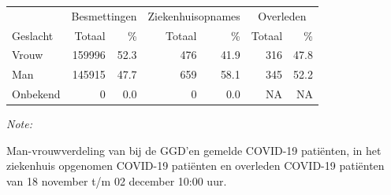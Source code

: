 \documentclass[
  english,
  man,floatsintext]{apa6}
\begin{document}
\newpage

\begin{table}
\centering\begingroup\fontsize{11}{13}\selectfont

\begin{threeparttable}
\begin{tabular}{lrrrrrr}
\toprule
\multicolumn{1}{c}{ } & \multicolumn{2}{c}{Besmettingen} & \multicolumn{2}{c}{Ziekenhuisopnames} & \multicolumn{2}{c}{Overleden} \\
\cmidrule(l{3pt}r{3pt}){2-3} \cmidrule(l{3pt}r{3pt}){4-5} \cmidrule(l{3pt}r{3pt}){6-7}
Geslacht & Totaal & \% & Totaal & \% & Totaal & \%\\
\midrule
Vrouw & 159996 & 52.3 & 476 & 41.9 & 316 & 47.8\\
Man & 145915 & 47.7 & 659 & 58.1 & 345 & 52.2\\
Onbekend & 0 & 0.0 & 0 & 0.0 & NA & NA\\
\bottomrule
\end{tabular}
\begin{tablenotes}
\item \textit{Note: } 
\item Man-vrouwverdeling van bij de GGD’en gemelde COVID-19 patiënten, in het ziekenhuis opgenomen COVID-19 patiënten en overleden COVID-19 patiënten van 18 november t/m 02 december 10:00 uur.
\end{tablenotes}
\end{threeparttable}
\endgroup{}
\end{table}
\newpage
\end{document}
